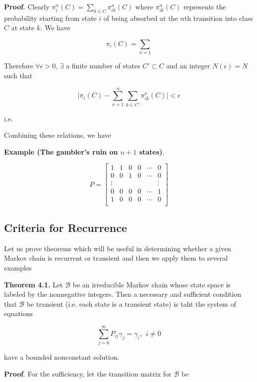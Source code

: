 \documentclass[12pt]{article}
\theoremstyle{nonumberbreak}
\begin{document}
\textbf{Proof}. Clearly $\pi_i^n (C) = \sum_{k \in C} \pi_{ik}^n (C)$ where $\pi_{ik}^n(C)$ represents the probability starting from state $i$ of being absorbed at the $n$th transition into class $C$ at state $k$. We have

$$
\pi_i(C) = \sum_{\nu = 1 }
$$


Therefore $\forall \epsilon >0$, $\exists$ a finite number of states $C' \subset C$ and an integer $N(\epsilon) = N$ such that 

$$
\vert \pi_i(C) - \sum_{\nu=1}^n \sum_{k \in C'} \pi_{ik}^\nu (C) \vert < \epsilon
$$

i.e.



Combining these relations, we have 


\textbf{Example (The gambler's ruin on $n+1$ states)}. 




$$
P = \begin{bmatrix}
1 & 1 & 0 & 0 & \cdots & 0 \\
0 & 0 & 1 & 0 & \cdots & 0 \\
\vdots &  &  &  &  & \vdots \\
0 & 0 & 0 & 0 & \cdots & 1 \\
1 & 0 & 0 & 0 & \cdots & 0 \\
\end{bmatrix}
$$



\subsection{Criteria for Recurrence}

Let us prove theorems which will be useful in determining whether a
given Markov chain is recurrent or transient and then we apply them to
several examples

\begin{theorem}
\textbf{Theorem 4.1.} Let $\mathcal{B}$ be an irreducible Markov chain whose state space is labeled by the nonnegative integers. Then a necessary and sufficient condition that $\mathcal{B}$ be transient (i.e. each state is a transient state) is taht the system of equations

$$
\sum_{j=0}^\infty P_{ij} \gamma_j = \gamma_i, \ \ i\neq0
$$

have a bounded nonconstant solution.

\end{theorem}

\textbf{Proof}. For the sufficiency, let the transition matrix for $\mathcal{B}$ be
\end{document}
